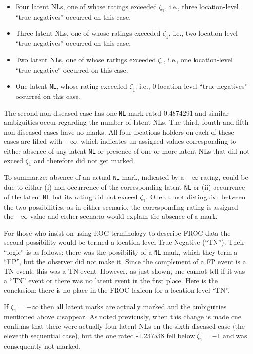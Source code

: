 \documentclass[
]{book}
\providecommand{\tightlist}{%
  \setlength{\itemsep}{0pt}\setlength{\parskip}{0pt}}
\begin{document}
\begin{itemize}
\tightlist
\item
  Four latent NLs, one of whose ratings exceeded \(\zeta_1\), i.e., three location-level ``true negatives'' occurred on this case.
\item
  Three latent NLs, one of whose ratings exceeded \(\zeta_1\), i.e., two location-level ``true negatives'' occurred on this case.
\item
  Two latent NLs, one of whose ratings exceeded \(\zeta_1\), i.e., one location-level ``true negative'' occurred on this case.
\item
  One latent \texttt{NL}, whose rating exceeded \(\zeta_1\), i.e., 0 location-level ``true negatives'' occurred on this case.
\end{itemize}

The second non-diseased case has one \texttt{NL} mark rated 0.4874291 and similar ambiguities occur regarding the number of latent NLs. The third, fourth and fifth non-diseased cases have no marks. All four locations-holders on each of these cases are filled with \(-\infty\), which indicates un-assigned values corresponding to either absence of any latent \texttt{NL} or presence of one or more latent NLs that did not exceed \(\zeta_1\) and therefore did not get marked.

To summarize: absence of an actual \texttt{NL} mark, indicated by a \(-\infty\) rating, could be due to either (i) non-occurrence of the corresponding latent \texttt{NL} or (ii) occurrence of the latent \texttt{NL} but its rating did not exceed \(\zeta_1\). One cannot distinguish between the two possibilities, as in either scenario, the corresponding rating is assigned the \(-\infty\) value and either scenario would explain the absence of a mark.

For those who insist on using ROC terminology to describe FROC data the second possibility would be termed a location level True Negative (``TN''). Their ``logic'' is as follows: there was the possibility of a \texttt{NL} mark, which they term a ``FP'', but the observer did not make it. Since the complement of a FP event is a TN event, this was a TN event. However, as just shown, one cannot tell if it was a ``TN'' event or there was no latent event in the first place. Here is the conclusion: there is no place in the FROC lexicon for a location level ``TN''.

If \(\zeta_1\) = \(-\infty\) then all latent marks are actually marked and the ambiguities mentioned above disappear. As noted previously, when this change is made one confirms that there were actually four latent NLs on the sixth diseased case (the eleventh sequential case), but the one rated -1.237538 fell below \(\zeta_1 = -1\) and was consequently not marked.
\end{document}
